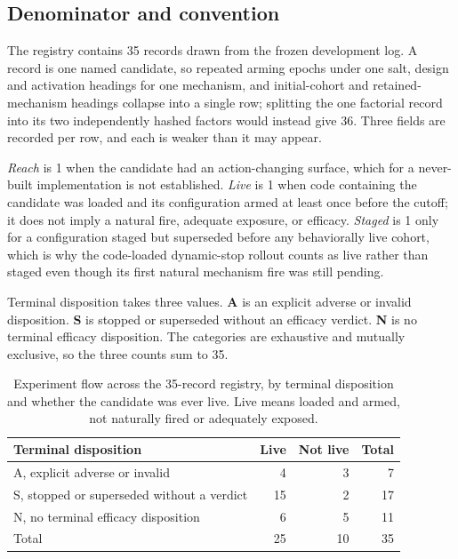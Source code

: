 \subsection{Denominator and convention}

The registry contains 35 records drawn from the frozen development log. A
record is one named candidate, so repeated arming epochs under one salt, design
and activation headings for one mechanism, and initial-cohort and
retained-mechanism headings collapse into a single row; splitting the one
factorial record into its two independently hashed factors would instead give
36. Three fields are recorded per row, and each is weaker than it may appear.

\emph{Reach} is 1 when the candidate had an action-changing surface, which for
a never-built implementation is not established. \emph{Live} is 1 when code
containing the candidate was loaded and its configuration armed at least once
before the cutoff; it does not imply a natural fire, adequate exposure, or
efficacy. \emph{Staged} is 1 only for a configuration staged but superseded
before any behaviorally live cohort, which is why the code-loaded dynamic-stop
rollout counts as live rather than staged even though its first natural
mechanism fire was still pending.

Terminal disposition takes three values. \textbf{A} is an explicit adverse or
invalid disposition. \textbf{S} is stopped or superseded without an efficacy
verdict. \textbf{N} is no terminal efficacy disposition. The categories are
exhaustive and mutually exclusive, so the three counts sum to 35.

\begin{table}[H]
\centering
\scriptsize
\caption{Experiment flow across the 35-record registry, by terminal
disposition and whether the candidate was ever live. Live means loaded and
armed, not naturally fired or adequately exposed.}
\label{tab:experiment-flow}
\setlength{\tabcolsep}{4.0pt}
\renewcommand{\arraystretch}{0.96}
\begin{tabular}{@{}lrrr@{}}
\toprule
Terminal disposition & Live & Not live & Total \\
\midrule
A, explicit adverse or invalid & 4 & 3 & 7 \\
S, stopped or superseded without a verdict & 15 & 2 & 17 \\
N, no terminal efficacy disposition & 6 & 5 & 11 \\
\midrule
Total & 25 & 10 & 35 \\
\bottomrule
\end{tabular}
\end{table}

